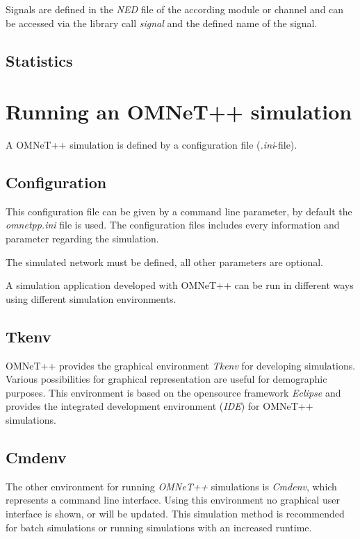 Signals are defined in the \emph{NED} file of the according module or channel and can be accessed via the library call \emph{signal} and the defined name of the signal. %


\subsection{Statistics}



\section{Running an OMNeT++ simulation}
A OMNeT++ simulation is defined by a configuration file (\emph{.ini}-file).

\subsection{Configuration}
This configuration file can be given by a command line parameter, by default the \emph{omnetpp.ini} file is used.
The configuration files includes every information and parameter regarding the simulation.

The simulated network must be defined, all other parameters are optional.



A simulation application developed with OMNeT++ can be run in different ways using different simulation environments.

\subsection{Tkenv}
OMNeT++ provides the graphical environment \emph{Tkenv} for developing simulations.
Various possibilities for graphical representation are useful for demographic purposes.
This environment is based on the opensource framework \emph{Eclipse} and provides the integrated development environment (\emph{IDE}) for OMNeT++ simulations.

\subsection{Cmdenv}
The other environment for running \emph{OMNeT++} simulations is \emph{Cmdenv}, which represents a command line interface.
Using this environment no graphical user interface is shown, or will be updated.
This simulation method is recommended for batch simulations or running simulations with an increased runtime.